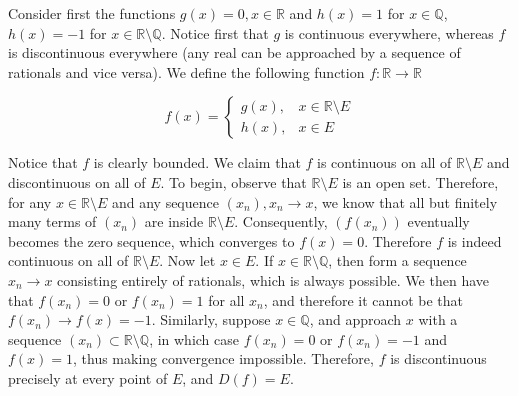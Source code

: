 \begin{solution}
    
    Consider first the functions $g(x) = 0, x \in \mathbb{R}$ and $h(x) = 1$ for $x \in \mathbb{Q}$, $h(x) = -1$ for $x \in \mathbb{R} \setminus \mathbb{Q}$.
    Notice first that $g$ is continuous everywhere, whereas $f$ is discontinuous everywhere (any real can be approached by a sequence of rationals and vice versa).
    We define the following function $f: \mathbb{R} \rightarrow \mathbb{R}$

    \[f(x) = \begin{cases}
        g(x), & x \in \mathbb{R} \setminus E \\
        h(x), & x \in E
    \end{cases}\]

    Notice that $f$ is clearly bounded.
    We claim that $f$ is continuous on all of $\mathbb{R} \setminus E$ and discontinuous on all of $E$.
    To begin, observe that $\mathbb{R} \setminus E$ is an open set.
    Therefore, for any $x \in \mathbb{R} \setminus E$ and any sequence $(x_n), x_n \rightarrow x$, we know that all but finitely many terms of $(x_n)$ are inside $\mathbb{R} \setminus E$.
    Consequently, $(f(x_n))$ eventually becomes the zero sequence, which converges to $f(x) = 0$.
    Therefore $f$ is indeed continuous on all of $\mathbb{R} \setminus E$.
    Now let $x \in E$.
    If $x \in \mathbb{R} \setminus \mathbb{Q}$, then form a sequence $x_n \rightarrow x$ consisting entirely of rationals, which is always possible.
    We then have that $f(x_n) = 0$ or $f(x_n) = 1$ for all $x_n$, and therefore it cannot be that $f(x_n) \rightarrow f(x) = -1$.
    Similarly, suppose $x \in \mathbb{Q}$, and approach $x$ with a sequence $(x_n) \subset \mathbb{R} \setminus \mathbb{Q}$, in which case $f(x_n) = 0$ or $f(x_n) = -1$ and $f(x) = 1$, thus making convergence impossible.
    Therefore, $f$ is discontinuous precisely at every point of $E$, and $D(f) = E$.
\end{solution}
